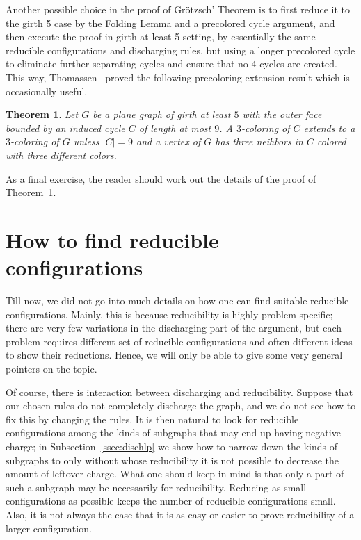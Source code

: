 \documentclass[12pt,twoside,openright,a4paper]{book}
\newtheorem{theorem}{Theorem}[chapter]
\begin{document}
Another possible choice in the proof of Gr\"otzsch' Theorem is to first reduce it to the girth 5 case by the Folding Lemma and a precolored cycle
argument, and then execute the proof in girth at least 5 setting, by essentially the same reducible configurations and discharging rules,
but using a longer precolored cycle to eliminate further separating cycles and ensure that no $4$-cycles are created.
This way, Thomassen~\cite{thom-torus} proved the following precoloring extension result which is occasionally useful.
\begin{theorem}\label{thm:precol9}
Let $G$ be a plane graph of girth at least $5$ with the outer face bounded by an induced cycle $C$ of length at most $9$.
A $3$-coloring of $C$ extends to a $3$-coloring of $G$ unless $|C|=9$ and a vertex of $G$ has three neihbors in $C$
colored with three different colors.
\end{theorem}
As a final exercise, the reader should work out the details of the proof of Theorem~\ref{thm:precol9}.

\section{How to find reducible configurations}\label{sec:howto-redu}

Till now, we did not go into much details on how one can find suitable reducible configurations.
Mainly, this is because reducibility is highly problem-specific;
there are very few variations in the discharging part of the argument, but each problem
requires different set of reducible configurations and often different ideas to show their
reductions.  Hence, we will only be able to give some very general pointers on the topic.

Of course, there is interaction between discharging and reducibility.  Suppose that our chosen rules
do not completely discharge the graph, and we do not see how to fix this by changing the rules.
It is then natural to look for reducible configurations among the kinds of subgraphs that may end up having
negative charge; in Subsection~\ref{ssec:dischlp} we show how to narrow down the kinds of subgraphs
to only without whose reducibility it is not possible to decrease the amount of leftover charge.
What one should keep in mind is that only a part of such a subgraph may be necessarily for reducibility.
Reducing as small configurations as possible keeps the number of reducible configurations small.
Also, it is not always the case that it is as easy or easier to prove reducibility of a larger configuration.
\end{document}
